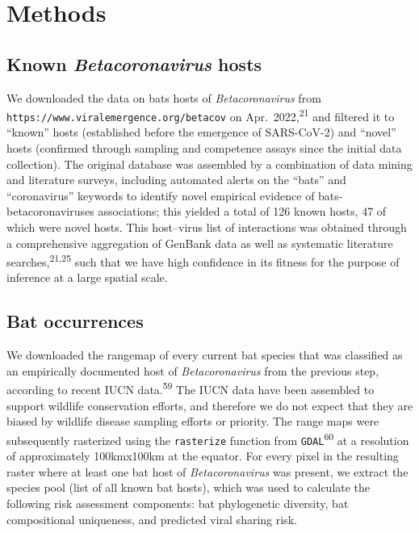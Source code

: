 \documentclass[10pt,oneside]{article}
\begin{document}
\newpage

\hypertarget{methods}{%
\section{Methods}\label{methods}}

\hypertarget{known-betacoronavirus-hosts}{%
\subsection{\texorpdfstring{Known \emph{Betacoronavirus}
hosts}{Known Betacoronavirus hosts}}\label{known-betacoronavirus-hosts}}

We downloaded the data on bats hosts of \emph{Betacoronavirus} from
\texttt{https://www.viralemergence.org/betacov} on
Apr.~2022,\textsuperscript{21} and filtered it to ``known'' hosts
(established before the emergence of SARS-CoV-2) and ``novel'' hosts
(confirmed through sampling and competence assays since the initial data
collection). The original database was assembled by a combination of
data mining and literature surveys, including automated alerts on the
``bats'' and ``coronavirus'' keywords to identify novel empirical
evidence of bats-betacoronaviruses associations; this yielded a total of
126 known hosts, 47 of which were novel hosts. This host--virus list of
interactions was obtained through a comprehensive aggregation of GenBank
data as well as systematic literature searches,\textsuperscript{21,25}
such that we have high confidence in its fitness for the purpose of
inference at a large spatial scale.

\hypertarget{bat-occurrences}{%
\subsection{Bat occurrences}\label{bat-occurrences}}

We downloaded the rangemap of every current bat species that was
classified as an empirically documented host of \emph{Betacoronavirus}
from the previous step, according to recent IUCN
data.\textsuperscript{59} The IUCN data have been assembled to support
wildlife conservation efforts, and therefore we do not expect that they
are biased by wildlife disease sampling efforts or priority. The range
maps were subsequently rasterized using the \texttt{rasterize} function
from \texttt{GDAL}\textsuperscript{60} at a resolution of approximately
100kmx100km at the equator. For every pixel in the resulting raster
where at least one bat host of \emph{Betacoronavirus} was present, we
extract the species pool (list of all known bat hosts), which was used
to calculate the following risk assessment components: bat phylogenetic
diversity, bat compositional uniqueness, and predicted viral sharing
risk.
\end{document}
